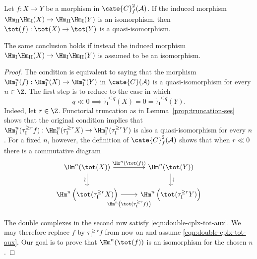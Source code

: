 \begin{theorem}\label{prop:double-cplx-tot}
	Let $f:X\to Y$ be a morphism in $\cate{C}^2_f(\mathcal{A})$. If the
	induced morphism
	$\Hm_{\mathrm{II}}\Hm_{\mathrm{I}}(X)\to
	\Hm_{\mathrm{II}}\Hm_{\mathrm{I}}(Y)$ is an isomorphism, then
	$\tot(f):\tot(X)\to\tot(Y)$ is a quasi-isomorphism.

	The same conclusion holds if instead the induced morphism
	$\Hm_{\mathrm{I}}\Hm_{\mathrm{II}}(X)\to
	\Hm_{\mathrm{I}}\Hm_{\mathrm{II}}(Y)$ is assumed to be an isomorphism.
\end{theorem}
\begin{proof}
	The condition is equivalent to saying that the morphism
	$\Hm_{\mathrm{I}}^n(f):\Hm_{\mathrm{I}}^n(X)\to
	\Hm_{\mathrm{I}}^n(Y)$ in $\cate{C}(\mathcal{A})$ is a quasi-isomorphism
	for every $n\in\Z$. The first step is to reduce to the case in which
	\begin{equation}\label{eqn:double-cplx-tot-aux}
		q \ll 0 \implies \tilde{\tau}_{\mathrm{I}}^{\leq q}(X) = 0 = \tilde{\tau}_{\mathrm{I}}^{\leq q}(Y).
	\end{equation}
	Indeed, let $r\in\Z$. Functorial truncation as in
	Lemma~\ref{prop:truncation-ses} shows that the original condition implies
	that
	$\Hm_{\mathrm{I}}^n(\tau_{\mathrm{I}}^{\geq r}f):
	\Hm_{\mathrm{I}}^n(\tau_{\mathrm{I}}^{\geq r}X)\to
	\Hm_{\mathrm{I}}^n(\tau_{\mathrm{I}}^{\geq r}Y)$ is also a
	quasi-isomorphism for every $n$. For a fixed $n$, however, the definition
	of $\cate{C}^2_f(\mathcal{A})$ shows that when $r\ll0$ there is a
	commutative diagram
	\begin{equation}\label{eqn:double-cplx-tot-aux2}\begin{tikzcd}
		\Hm^n(\tot(X)) \arrow[r, "{\Hm^n(\tot(f))}"] \arrow[d, "\sim"' sloped] & \Hm^n(\tot(Y)) \arrow[d, "\sim" sloped] \\
		\Hm^n\left( \tot(\tau_{\mathrm{I}}^{\geq r} X) \right) \arrow[r, "{\Hm^n\left( \tot (\tau_{\mathrm{I}}^{\geq r} f) \right)}"' inner sep=0.8em] & \Hm^n\left( \tot(\tau_{\mathrm{I}}^{\geq r} Y) \right)
	\end{tikzcd}\end{equation}
	The double complexes in the second row satisfy
	\eqref{eqn:double-cplx-tot-aux}. We may therefore replace $f$ by
	$\tau_{\mathrm{I}}^{\geq r}f$ from now on and assume
	\eqref{eqn:double-cplx-tot-aux}. Our goal is to prove that
	$\Hm^n(\tot(f))$ is an isomorphism for the chosen $n$.


\end{proof}

